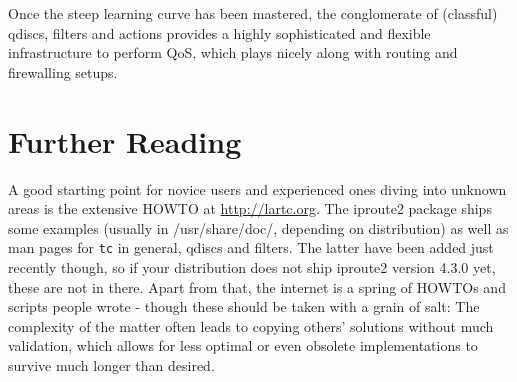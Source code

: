 \documentclass[12pt,twoside]{article}
\newcommand{\cmd}{\texttt}
\begin{document}
Once the steep learning curve has been mastered, the conglomerate of (classful)
qdiscs, filters and actions provides a highly sophisticated and flexible
infrastructure to perform QoS, which plays nicely along with routing and
firewalling setups.


\section*{Further Reading}

A good starting point for novice users and experienced ones diving into unknown
areas is the extensive HOWTO at \url{http://lartc.org}. The iproute2 package ships
some examples (usually in /usr/share/doc/, depending on distribution) as well as
man pages for \cmd{tc} in general, qdiscs and filters. The latter have been added
just recently though, so if your distribution does not ship iproute2 version
4.3.0 yet, these are not in there. Apart from that, the internet is a spring of
HOWTOs and scripts people wrote - though these should be taken with a grain of
salt: The complexity of the matter often leads to copying others' solutions
without much validation, which allows for less optimal or even obsolete
implementations to survive much longer than desired.
\end{document}
